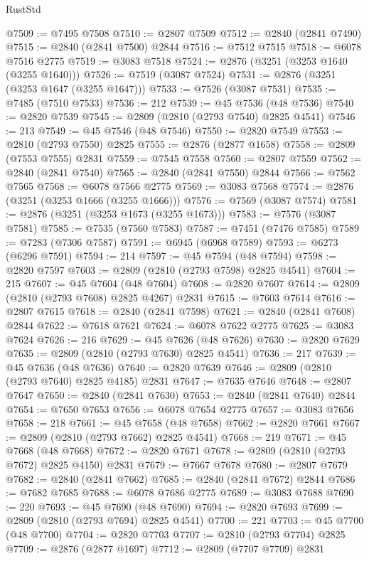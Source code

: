 \begin{lexlean}{RustStd}
\begin{coremodule}
@7509 := @7495 @7508
@7510 := @2807 @7509
@7512 := @2840 (@2841 @7490)
@7515 := @2840 (@2841 @7500) @2844
@7516 := @7512 @7515
@7518 := @6078 @7516 @2775
@7519 := @3083 @7518
@7524 := @2876 (@3251 (@3253 @1640 (@3255 @1640)))
@7526 := @7519 (@3087 @7524)
@7531 := @2876 (@3251 (@3253 @1647 (@3255 @1647)))
@7533 := @7526 (@3087 @7531)
@7535 := @7485 (@7510 @7533)
@7536 := 212
@7539 := @45 @7536 (@48 @7536)
@7540 := @2820 @7539
@7545 := @2809 (@2810 (@2793 @7540) @2825 @4541)
@7546 := 213
@7549 := @45 @7546 (@48 @7546)
@7550 := @2820 @7549
@7553 := @2810 (@2793 @7550) @2825
@7555 := @2876 (@2877 @1658)
@7558 := @2809 (@7553 @7555) @2831
@7559 := @7545 @7558
@7560 := @2807 @7559
@7562 := @2840 (@2841 @7540)
@7565 := @2840 (@2841 @7550) @2844
@7566 := @7562 @7565
@7568 := @6078 @7566 @2775
@7569 := @3083 @7568
@7574 := @2876 (@3251 (@3253 @1666 (@3255 @1666)))
@7576 := @7569 (@3087 @7574)
@7581 := @2876 (@3251 (@3253 @1673 (@3255 @1673)))
@7583 := @7576 (@3087 @7581)
@7585 := @7535 (@7560 @7583)
@7587 := @7451 (@7476 @7585)
@7589 := @7283 (@7306 @7587)
@7591 := @6945 (@6968 @7589)
@7593 := @6273 (@6296 @7591)
@7594 := 214
@7597 := @45 @7594 (@48 @7594)
@7598 := @2820 @7597
@7603 := @2809 (@2810 (@2793 @7598) @2825 @4541)
@7604 := 215
@7607 := @45 @7604 (@48 @7604)
@7608 := @2820 @7607
@7614 := @2809 (@2810 (@2793 @7608) @2825 @4267) @2831
@7615 := @7603 @7614
@7616 := @2807 @7615
@7618 := @2840 (@2841 @7598)
@7621 := @2840 (@2841 @7608) @2844
@7622 := @7618 @7621
@7624 := @6078 @7622 @2775
@7625 := @3083 @7624
@7626 := 216
@7629 := @45 @7626 (@48 @7626)
@7630 := @2820 @7629
@7635 := @2809 (@2810 (@2793 @7630) @2825 @4541)
@7636 := 217
@7639 := @45 @7636 (@48 @7636)
@7640 := @2820 @7639
@7646 := @2809 (@2810 (@2793 @7640) @2825 @4185) @2831
@7647 := @7635 @7646
@7648 := @2807 @7647
@7650 := @2840 (@2841 @7630)
@7653 := @2840 (@2841 @7640) @2844
@7654 := @7650 @7653
@7656 := @6078 @7654 @2775
@7657 := @3083 @7656
@7658 := 218
@7661 := @45 @7658 (@48 @7658)
@7662 := @2820 @7661
@7667 := @2809 (@2810 (@2793 @7662) @2825 @4541)
@7668 := 219
@7671 := @45 @7668 (@48 @7668)
@7672 := @2820 @7671
@7678 := @2809 (@2810 (@2793 @7672) @2825 @4150) @2831
@7679 := @7667 @7678
@7680 := @2807 @7679
@7682 := @2840 (@2841 @7662)
@7685 := @2840 (@2841 @7672) @2844
@7686 := @7682 @7685
@7688 := @6078 @7686 @2775
@7689 := @3083 @7688
@7690 := 220
@7693 := @45 @7690 (@48 @7690)
@7694 := @2820 @7693
@7699 := @2809 (@2810 (@2793 @7694) @2825 @4541)
@7700 := 221
@7703 := @45 @7700 (@48 @7700)
@7704 := @2820 @7703
@7707 := @2810 (@2793 @7704) @2825
@7709 := @2876 (@2877 @1697)
@7712 := @2809 (@7707 @7709) @2831

\end{coremodule}
\end{lexlean}
